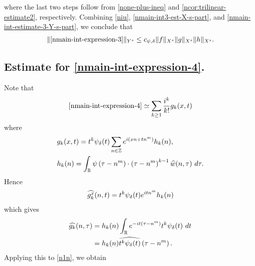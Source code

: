 %
%
where the last two steps follow from \eqref{none-plus-ineq} and
\cref{ncor:trilinear-estimate2}, respectively. Combining \eqref{niu},
\eqref{nmain-int3-est-X-s-part}, and \eqref{nmain-int-estimate-3-Y-s-part}, we
conclude that
%
%
\begin{equation}
	\label{nmain-int3-est}
	\begin{split}
		\|\eqref{nmain-int-expression-3}\|_{Y^s} 
    \le c_{\psi, \delta} \|f\|_{X^s} \|g\|_{X^s} \|h\|_{X^s}.
	\end{split}
\end{equation}
%
%
%
\subsection{Estimate for
\texorpdfstring{\eqref{nmain-int-expression-4}}{Expression 4}.}
Note that
%
%
\begin{equation}
	\label{n1n}
	\begin{split}
		\eqref{nmain-int-expression-4} \simeq \sum_{k \ge 1}
		\frac{i^k}{k!}g_k(x,t)
	\end{split}
\end{equation}
%
%
where 
%
%
\begin{equation*}
	\begin{split}
		& g_k(x,t) = t^k \psi_{\delta}(t) \sum_{n \in \mathbb{Z}} e^{i\left( xn + tn^{m}
		\right)} h_k(n),
		\\
		& h_k(n) = \int_{\mathbb{R}} \psi \left( \tau - n^{m } \right) \cdot \left(
		\tau - n^{m } \right)^{k -1} \widehat{w}(n, \tau) \ d \tau.
	\end{split}
\end{equation*}
%
%
Hence
%
%
\begin{equation*}
	\begin{split}
		\widehat{g_k^x}(n, t) = t^{k} \psi_{\delta}(t) e^{i t n^{m }} h_k(n)
	\end{split}
\end{equation*}
%
%
which gives
%
%
\begin{equation*}
	\begin{split}
		\widehat{g_k}(n, \tau)
		& = h_k(n) \int_{\mathbb{R}} e^{-it\left( \tau - n^{m } \right)}
		t^{k}\psi_{\delta}(t) \ dt
		\\
		& = h_k(n) \widehat{t^{k}\psi_{\delta}(t)} \left( \tau - n^{m } \right).
	\end{split}
\end{equation*}
%
%
Applying this to \eqref{n1n}, we obtain
%
%

